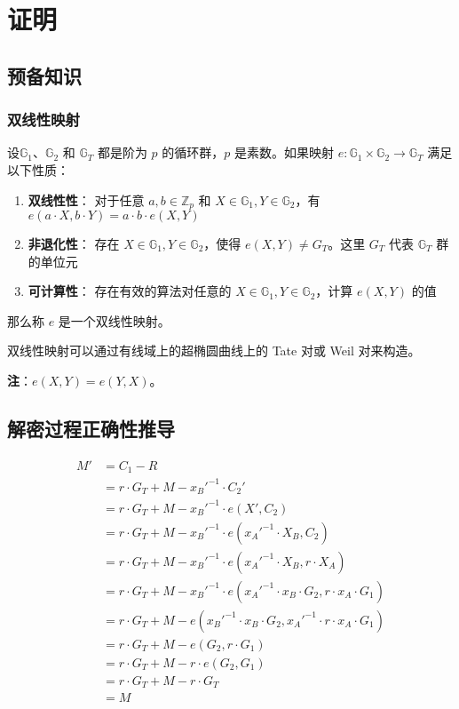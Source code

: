 \documentclass[a4paper,10pt]{article}
\newcommand{\bG}{\mathbb{G}}
\newcommand{\bZ}{\mathbb{Z}}
\begin{document}
\section{证明}
\subsection{预备知识}
\subsubsection{双线性映射}
设\(\bG_1\)、\(\bG_2\) 和 \(\bG_T\) 都是阶为 \(p\) 的循环群，\(p\) 是素数。如果映射 \(e: \bG_1\times\bG_2\rightarrow\bG_T\) 满足以下性质：

\begin{enumerate}
  \item \textbf{双线性性}： 对于任意 \(a,b\in \bZ_p\) 和 \(X\in\bG_1, Y\in\bG_2\)，有 \(e(a\cdot X, b\cdot Y) = a\cdot b\cdot e(X, Y)\)
  \item \textbf{非退化性}： 存在 \(X\in\bG_1, Y\in\bG_2\)，使得 \(e(X,Y)\neq G_T\)。这里 \(G_T\) 代表 \(\bG_T\) 群的单位元
  \item \textbf{可计算性}： 存在有效的算法对任意的 \(X\in\bG_1, Y\in\bG_2\)，计算 \(e(X,Y)\) 的值
\end{enumerate}

那么称 \(e\) 是一个双线性映射。

双线性映射可以通过有线域上的超椭圆曲线上的 Tate 对或 Weil 对来构造。

\textbf{注}：\(e(X,Y)=e(Y,X)\)。

\subsection{解密过程正确性推导}
\begin{align*}
  M' &= C_1-R \\
     &= r\cdot G_T + M - x_B'^{-1} \cdot C_2' \\
     &= r\cdot G_T + M - x_B'^{-1} \cdot e(X',C_2) \\
     &= r\cdot G_T + M - x_B'^{-1} \cdot e(x_A'^{-1}\cdot X_B,C_2) \\
     &= r\cdot G_T + M - x_B'^{-1} \cdot e(x_A'^{-1}\cdot X_B,r\cdot X_A) \\
     &= r\cdot G_T + M - x_B'^{-1} \cdot e(x_A'^{-1}\cdot x_B \cdot G_2,r\cdot x_A\cdot G_1) \\
     &= r\cdot G_T + M - e(x_B'^{-1}\cdot x_B \cdot G_2,x_A'^{-1} \cdot r\cdot x_A\cdot G_1) \\
     &= r\cdot G_T + M - e(G_2,r\cdot G_1) \\
     &= r\cdot G_T + M - r\cdot e(G_2,G_1) \\
     &= r\cdot G_T + M - r\cdot G_T \\
     &= M
\end{align*}
\end{document}
